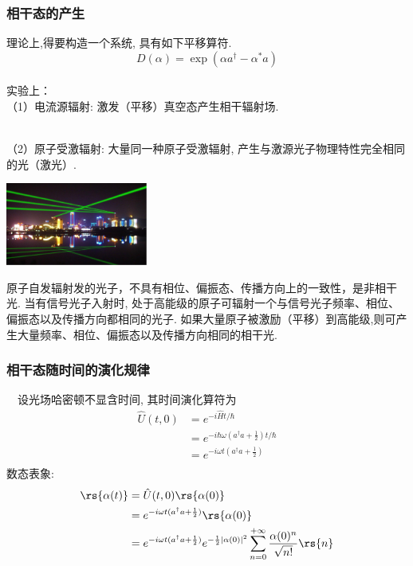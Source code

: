\begin{frame}
    \frametitle{相干态的产生}
  理论上,得要构造一个系统, 具有如下平移算符. 
  \[ D(\alpha)=\exp \left(\alpha a^{\dagger}-\alpha^{*} a\right) \]
  ~\\ {\vspace*{2.3em}} 
  实验上：\\
  （1）电流源辐射: 激发（平移）真空态产生相干辐射场.
\end{frame}

\begin{frame}
    ~\\
   （2）原子受激辐射: 大量同一种原子受激辐射, 产生与激源光子物理特性完全相同的光（激光）.  
     \begin{center}
      \includegraphics[width=0.35\textwidth]{figs/8.png}
    \end{center}   
 原子自发辐射发的光子，不具有相位、偏振态、传播方向上的一致性，是非相干光. 当有信号光子入射时, 处于高能级的原子可辐射一个与信号光子频率、相位、偏振态以及传播方向都相同的光子. 如果大量原子被激励（平移）到高能级,则可产生大量频率、相位、偏振态以及传播方向相同的相干光.  
\end{frame}

\begin{frame}
    \frametitle{相干态随时间的演化规律}
        \例[11. 已知$t=0$时刻的相干态为$\rs{\alpha (0)}$, 试求t时刻的相干态$\rs{\alpha (t)}$  ]{}
        \解 ~ 设光场哈密顿不显含时间, 其时间演化算符为
    \[ \begin{aligned}
     \hat{U}(t, 0)  &= e^{-i \hat{H}t / \hbar}\\ 
     &= e^{-i \hbar \omega ( a^\dagger a+\frac{1}{2} ) t / \hbar} \\ 
     &= e^{-i \omega t (a^\dagger a +\frac{1}{2} )}  \\ 
    \end{aligned}\]
    数态表象:
    \[ \begin{aligned}
        \rs{\alpha (t)} &= \hat{U}(t, 0) \rs{\alpha (0)} \\ 
        &= e^{-i \omega t ( a^\dagger a +\frac{1}{2} )} \rs{\alpha (0)} \\ 
        &= e^{-i \omega t ( a^\dagger a +\frac{1}{2} )} e^{-\frac{1}{2}\left|\alpha(0)\right|^2}  \sum_{n=0} ^{+\infty}  \frac{\alpha(0)^n}{\sqrt{n!}} \rs{n}  \\  
       \end{aligned}\]
\end{frame}

